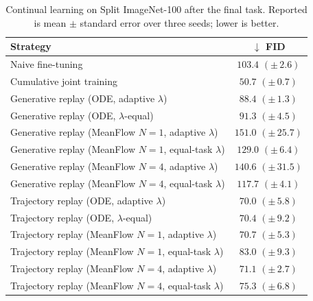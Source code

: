\begin{table}[t]
\centering
\caption{Continual learning on Split ImageNet-100 after the final task. Reported is mean {\scriptsize$\pm$} standard error over three seeds; lower is better.}
\label{tab:imagenet100_cl_fm}
\begin{tabular}{lc}
\toprule
Strategy & $\downarrow$ FID \\
\midrule
Naive fine-tuning & $103.4$ {\scriptsize $(\pm\,2.6)$} \\
Cumulative joint training & $50.7$ {\scriptsize $(\pm\,0.7)$} \\
\midrule
Generative replay (ODE, adaptive $\lambda$) & $88.4$ {\scriptsize $(\pm\,1.3)$} \\
Generative replay (ODE, $\lambda$-equal) & $91.3$ {\scriptsize $(\pm\,4.5)$} \\
\midrule
Generative replay (MeanFlow $N{=}1$, adaptive $\lambda$) & $151.0$ {\scriptsize $(\pm\,25.7)$} \\
Generative replay (MeanFlow $N{=}1$, equal-task $\lambda$) & $129.0$ {\scriptsize $(\pm\,6.4)$} \\
Generative replay (MeanFlow $N{=}4$, adaptive $\lambda$) & $140.6$ {\scriptsize $(\pm\,31.5)$} \\
Generative replay (MeanFlow $N{=}4$, equal-task $\lambda$) & $117.7$ {\scriptsize $(\pm\,4.1)$} \\
\midrule
Trajectory replay (ODE, adaptive $\lambda$) & $70.0$ {\scriptsize $(\pm\,5.8)$} \\
Trajectory replay (ODE, $\lambda$-equal) & $70.4$ {\scriptsize $(\pm\,9.2)$} \\
\midrule
Trajectory replay (MeanFlow $N{=}1$, adaptive $\lambda$) & $70.7$ {\scriptsize $(\pm\,5.3)$} \\
Trajectory replay (MeanFlow $N{=}1$, equal-task $\lambda$) & $83.0$ {\scriptsize $(\pm\,9.3)$} \\
Trajectory replay (MeanFlow $N{=}4$, adaptive $\lambda$) & $71.1$ {\scriptsize $(\pm\,2.7)$} \\
Trajectory replay (MeanFlow $N{=}4$, equal-task $\lambda$) & $75.3$ {\scriptsize $(\pm\,6.8)$} \\
\bottomrule
\end{tabular}
\end{table}
